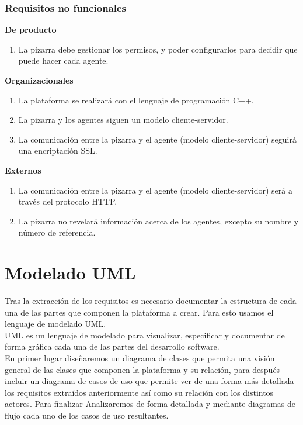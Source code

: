 \subsubsection{Requisitos no funcionales}
\textbf{De producto}
	\begin{enumerate}
		\item La pizarra debe gestionar los permisos, y poder configurarlos para decidir que puede hacer cada agente.
	\end{enumerate}
\textbf{Organizacionales}
	\begin{enumerate}
		\item La plataforma se realizará con el lenguaje de programación C++.
		\item La pizarra y los agentes siguen un modelo cliente-servidor.
		\item La comunicación entre la pizarra y el agente (modelo cliente-servidor) seguirá una encriptación SSL.
	\end{enumerate}
\textbf{Externos}
	\begin{enumerate}
		\item La comunicación entre la pizarra y el agente (modelo cliente-servidor) será a través del protocolo HTTP.
		\item La pizarra no revelará información acerca de los agentes, excepto su nombre y número de referencia.
	\end{enumerate}
	
\section{Modelado UML}
Tras la extracción de los requisitos es necesario documentar la estructura de cada una de las partes que componen la plataforma a crear. Para esto usamos el lenguaje de modelado UML.\\

UML es un lenguaje de modelado para visualizar, especificar y documentar de forma gráfica cada una de las partes del desarrollo software. \\

En primer lugar diseñaremos un diagrama de clases que permita una visión general de las clases que componen la plataforma y su relación, para después incluir \color{red}un diagrama de casos de uso \color{black}que permite ver de una forma más detallada los requisitos extraídos anteriormente así como su relación con los distintos actores. Para finalizar Analizaremos de forma detallada y mediante diagramas de flujo cada uno de los casos de uso resultantes.\\

